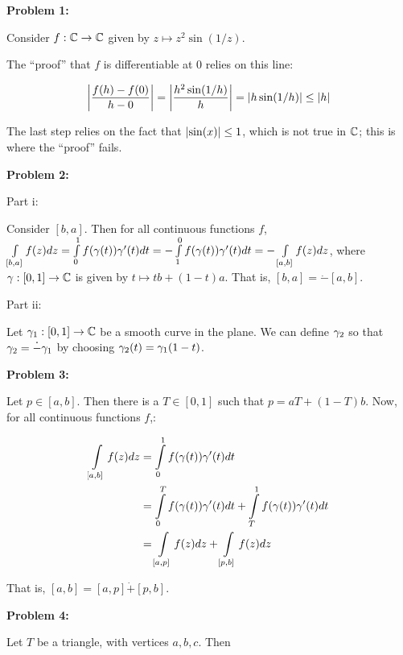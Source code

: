 \documentclass[a4paper,12pt]{article}
\begin{document}
{\bf Problem 1:}

Consider $f: \mathbb{C} \to \mathbb{C}$ given by $z \mapsto z^2 \sin(1/z)$. 

The ``proof'' that $f$ is differentiable at $0$ relies on this line:

\begin{displaymath}
\left\lvert \frac{f(h) - f(0)}{h-0} \right\rvert = \left\lvert \frac{h^2 \sin(1/h)}{h} \right\rvert = \left\lvert h \sin(1/h) \right\rvert \leq \left\lvert h \right\rvert
\end{displaymath}

The last step relies on the fact that $\left\lvert \sin(x) \right\rvert \leq 1$, which is not true in $\mathbb{C}$; this is where the ``proof'' fails.

\shunt

{\bf Problem 2:}

Part i:

Consider $[b,a]$. Then for all continuous functions $f$, $\int\limits_{[b,a]} f(z) dz = \int\limits_0^1 f(\gamma(t)) \gamma'(t)dt =  -\int\limits_1^0 f(\gamma(t))\gamma'(t) dt = -\int\limits_{[a,b]} f(z) dz$, where $\gamma: [0,1] \to \mathbb{C}$ is given by $t \mapsto tb + (1-t)a$. That is, $[b,a] = \dot{-}[a,b]$. 

\shunt

Part ii:

Let $\gamma_1: [0,1] \to \mathbb{C}$ be a smooth curve in the plane. We can define $\gamma_2$ so that $\gamma_2 = \dot{-} \gamma_1$ by choosing $\gamma_2(t) = \gamma_1(1-t)$.

\shunt

{\bf Problem 3:}

Let $p \in [a,b]$. Then there is a $T \in [0,1]$ such that $p = aT + (1-T)b$. Now, for all continuous functions $f$,:

\begin{align*}
\int\limits_{[a,b]} f(z) dz &= \int\limits_0^1 f(\gamma(t)) \gamma'(t) dt \\
&= \int\limits_0^T f(\gamma(t)) \gamma'(t) dt + \int\limits_T^1 f(\gamma(t)) \gamma'(t) dt \\
&= \int\limits_{[a,p]} f(z)dz + \int\limits_{[p,b]} f(z)dz \\
\end{align*}

That is, $[a,b] = [a,p] \dot{+} [p,b]$.

\shunt

{\bf Problem 4:}

Let $T$ be a triangle, with vertices $a,b,c$. Then 
\end{document}
